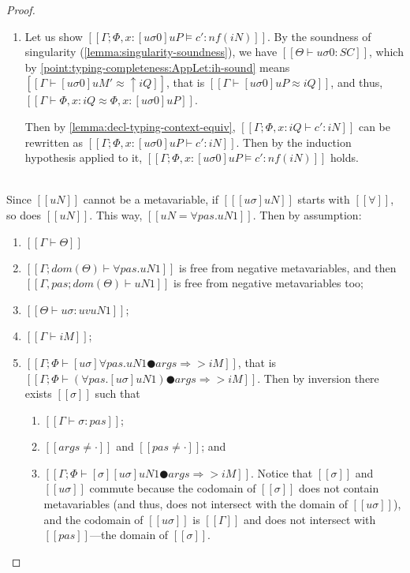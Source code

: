 \begin{proof}
\begin{caseof}
\begin{enumerate}
                \item Let us show $[[Γ; Φ, x:[uσ0]uP ⊨ c' : nf(iN)]]$.
                    By the soundness of singularity 
                    (\cref{lemma:singularity-soundness}),
                    we have $[[ Θ ⊢ uσ0 : SC ]]$,
                    which by \ref{point:typing-completeness:AppLet:ih-sound}
                    means $[[Γ ⊢ [uσ0]uM' ≈ ↑iQ]]$,
                    that is $[[Γ ⊢ [uσ0]uP ≈ iQ]]$, 
                    and thus, $[[Γ ⊢ Φ, x:iQ ≈ Φ, x:[uσ0]uP]]$.

                    Then by \cref{lemma:decl-typing-context-equiv},
                    $[[Γ; Φ, x:iQ ⊢ c' : iN]]$ can be rewritten as
                    $[[Γ; Φ, x:[uσ0]uP ⊢ c' : iN]]$.
                    Then by the induction hypothesis applied to it, 
                    $[[Γ; Φ, x:[uσ0]uP ⊨ c' : nf(iN)]]$ holds.
            \end{enumerate}

        \item {}\\
            Since $[[uN]]$ cannot be a metavariable,  
            if $[[ [uσ]uN ]]$ starts with $[[∀]]$,
            so does $[[uN]]$. This way,
            $[[uN = ∀pas.uN1]]$.
            Then by assumption:
            \begin{enumerate}
                \item $[[Γ ⊢ Θ]]$
                \item $[[Γ; dom(Θ) ⊢  ∀pas.uN1]]$ is free from negative metavariables, 
                    and then $[[Γ, pas; dom(Θ) ⊢  uN1]]$ is free from negative metavariables too;
                \item $[[Θ ⊢ uσ : uv uN1]]$;
                \item $[[Γ ⊢ iM]]$;
                \item $[[Γ; Φ ⊢ [uσ]∀pas.uN1 ● args ⇒> iM]]$, 
                    \label{point:typing-completeness-forall-app-inversion}
                    that is $[[Γ; Φ ⊢ (∀pas.[uσ]uN1) ● args ⇒> iM]]$.
                    Then by inversion there exists $[[σ]]$ such that 
                    \begin{enumerate}
                        \item $[[Γ ⊢ σ : pas]]$;
                        \item $[[args ≠ ·]]$ and $[[pas ≠ ·]]$; and
                        \item $[[Γ ; Φ ⊢ [σ][uσ]uN1 ● args ⇒> iM]]$.
                            \label{point:typing-completeness-forall-app-inversion-2}
                            Notice that $[[σ]]$ and $[[uσ]]$ commute because 
                            the codomain of $[[σ]]$ does not contain
                            metavariables (and thus, does not intersect with 
                            the domain of $[[uσ]]$), and the codomain of $[[uσ]]$ is 
                            $[[Γ]]$ and does not intersect with $[[pas]]$---the domain of $[[σ]]$.


\end{enumerate}
\end{enumerate}
\end{caseof}
\end{proof}
